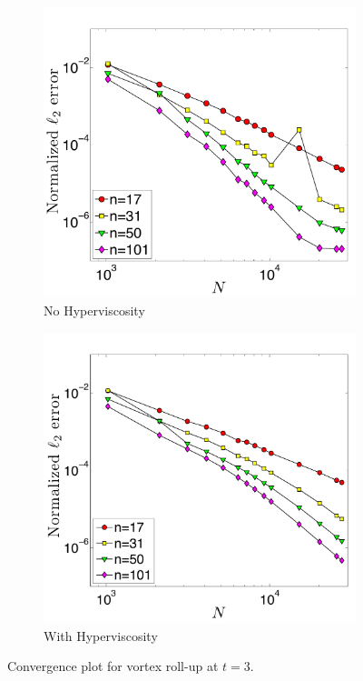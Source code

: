 \documentclass{report}
\begin{document}
\begin{figure}
\centering
\begin{subfigure}[b]{0.48\textwidth}
\centering
\includegraphics[width=\textwidth] {../figures/paper1/figures/vortex_rollup/convergence_plot_nohv_color.pdf}
\caption{No Hyperviscosity}
\label{fig:conv_plot_vortex_nohv}
\end{subfigure}
\begin{subfigure}[b]{0.48\textwidth}
\centering
\includegraphics[width=\textwidth] {../figures/paper1/figures/vortex_rollup/convergence_plot_hv_color.pdf}
\caption{With Hyperviscosity}
\label{fig:conv_plot_vortex_hv}
\end{subfigure}
\caption{Convergence plot for vortex roll-up at $t=3$.}
\label{fig:conv_plot_vortex}
\end{figure}
\end{document}
